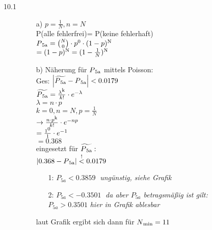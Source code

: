 \documentclass[a4paper]{article}
\begin{document}
\begin{description}
\newpage		
\item[10.1] 
		\begin{itemize}
			\item[a)] $p=\frac{1}{N}, n=N$\\
			
								P(alle fehlerfrei)= P(keine fehlerhaft)\\
								
								$P\textsubscript{5a}= \binom{N}{0} \cdot p\textsuperscript{0} \cdot (1-p)\textsuperscript{N}$\\
								$=(1-p)\textsuperscript{N} = (1-\frac{1}{N})\textsuperscript{N}$\\
			
			\item[b)] Näherung für $P\textsubscript{5a}$ mittels Poisson:\\
								
								Ges: $\left|\widetilde{P\textsubscript{5a}}-P\textsubscript{5a}\right| < 0.0179$\\
								
								$\widetilde{P\textsubscript{5a}} = \frac{\lambda\textsuperscript{k}}{k!} \cdot e^{-\lambda}$\\ 			
								$\lambda= n\cdot p$\\
								$k=0, n=N, p=\frac{1}{N}$\\
								$\rightarrow \frac{n\cdot p\textsuperscript{k}}{k!} \cdot e^{-np}$\\
								$= \frac{1\textsuperscript{0}}{1} \cdot e^{-1}$\\
								$=0.368$\\
								
								eingesetzt für $\widetilde{P\textsubscript{5a}}:$\\
								
								$\left|0.368-P\textsubscript{5a}\right| \stackrel{!}{<} 0.0179$\\
								\begin{itemize}
									\item[1:] $P_{5a} < 0.3859 \;$ \textit{ungünstig, siehe Grafik}
									\item[2:] $P_{5a} < -0.3501 \;$ \textit{da aber $P_{5a}$ betragsmäßig ist gilt:}\\
														$P_{5a} > 0.3501$ \textit{hier in Grafik ablesbar}
								\end{itemize}
								
								
								laut Grafik ergibt sich dann für $N\textsubscript{min}= 11$\\
										

\end{itemize}
\end{description}
\end{document}
